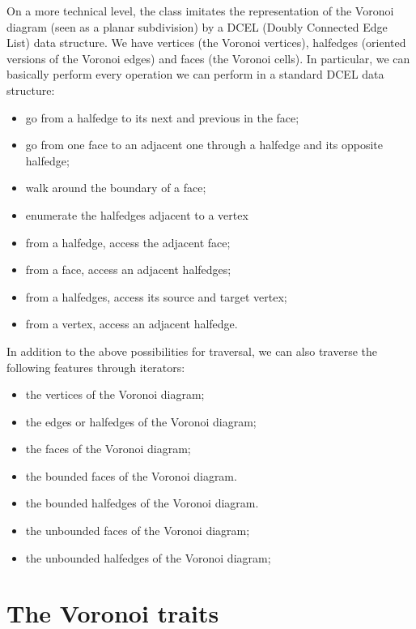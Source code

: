On a more technical level, the 
class imitates the representation of the Voronoi diagram (seen as a
planar subdivision) by a DCEL (Doubly Connected Edge List) data
structure. We have vertices (the Voronoi vertices), halfedges
(oriented versions of the Voronoi edges) and faces (the Voronoi
cells). In particular, we can basically perform every operation we can
perform in a standard DCEL data structure:
\begin{itemize}
\item go from a halfedge to its next and previous in the face;
\item go from one face to an adjacent one through a halfedge and its
  opposite halfedge;
\item walk around the boundary of a face;
\item enumerate the halfedges adjacent to a vertex
\item from a halfedge, access the adjacent face;
\item from a face, access an adjacent halfedges;
\item from a halfedges, access its source and target vertex;
\item from a vertex, access an adjacent halfedge.
\end{itemize}
In addition to the above possibilities for traversal, we can also
traverse the following features through iterators:
\begin{itemize}
\item the vertices of the Voronoi diagram;
\item the edges or halfedges of the Voronoi diagram;
\item the faces of the Voronoi diagram;
\item the bounded faces of the Voronoi diagram.
\item the bounded halfedges of the Voronoi diagram.
\item the unbounded faces of the Voronoi diagram;
\item the unbounded halfedges of the Voronoi diagram;
\end{itemize}


\section{The Voronoi traits}
\label{sec:vda2-traits}

